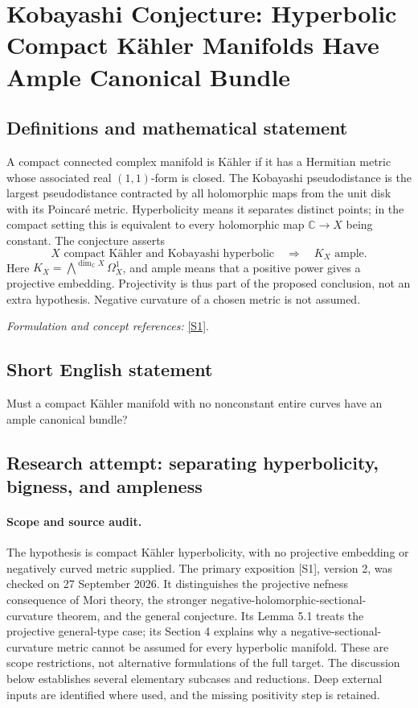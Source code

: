 \documentclass[11pt]{article}
\begin{document}
\section*{\texorpdfstring{Kobayashi Conjecture: Hyperbolic Compact Kähler Manifolds Have Ample Canonical Bundle}{Kobayashi Conjecture: Hyperbolic Compact Kähler Manifolds Have Ample Canonical Bundle}}\label{30006887}
\subsection{Definitions and mathematical statement}
A compact connected complex manifold is K\"ahler if it has a Hermitian metric whose associated real $(1,1)$-form is closed. The Kobayashi pseudodistance is the largest pseudodistance contracted by all holomorphic maps from the unit disk with its Poincar\'e metric. Hyperbolicity means it separates distinct points; in the compact setting this is equivalent to every holomorphic map ${\mathbb{C}}\to X$ being constant. The conjecture asserts
\[
 X\text{ compact K\"ahler and Kobayashi hyperbolic}
 \quad\Longrightarrow\quad K_X\text{ ample}.
\]
Here $K_X=\bigwedge^{\dim_{{\mathbb{C}}} X}\Omega_X^1$, and ample means that a positive power gives a projective embedding. Projectivity is thus part of the proposed conclusion, not an extra hypothesis. Negative curvature of a chosen metric is not assumed.
\par\smallskip\textit{Formulation and concept references:} \href{https://arxiv.org/pdf/2011.11379}{[S1]}.

\subsection{Short English statement}
Must a compact K\"ahler manifold with no nonconstant entire curves have an ample canonical bundle?
\subsection{Research attempt: separating hyperbolicity, bigness, and ampleness}
\paragraph{Scope and source audit.}
The hypothesis is compact K\"ahler hyperbolicity, with no projective embedding or negatively curved metric supplied. The primary exposition [S1], version 2, was checked on 27 September 2026. It distinguishes the projective nefness consequence of Mori theory, the stronger negative-holomorphic-sectional-curvature theorem, and the general conjecture. Its Lemma 5.1 treats the projective general-type case; its Section 4 explains why a negative-sectional-curvature metric cannot be assumed for every hyperbolic manifold. These are scope restrictions, not alternative formulations of the full target. The discussion below establishes several elementary subcases and reductions. Deep external inputs are identified where used, and the missing positivity step is retained.
\end{document}
